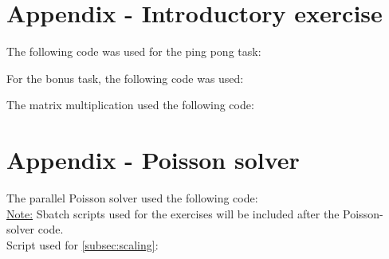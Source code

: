 
\section*{Appendix - Introductory exercise}
\label{app:pingpong}
The following code was used for the ping pong task:

For the bonus task, the following code was used:


\label{app:mm}
The matrix multiplication used the following code: 


\section*{Appendix - Poisson solver}
\label{app:poisson}
The parallel Poisson solver used the following code:\\
\underline{Note:} Sbatch scripts used for the exercises will be included after the Poisson-solver code.\\

Script used for \autoref{subsec:scaling}:
